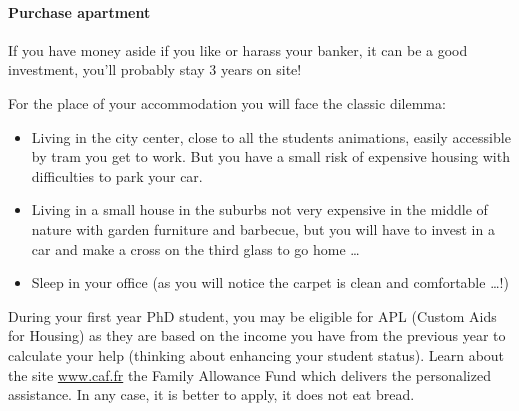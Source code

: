 \paragraph{Purchase apartment}
If you have money aside if you like or harass your banker, it can be a good investment, you'll probably stay 3 years on site!

For the place of your accommodation you will face the classic dilemma:
\begin{itemize}
  \item Living in the city center, close to all the students animations, easily accessible by tram you get to work. But you have a small risk of expensive housing with difficulties to park your car.
  \item Living in a small house in the suburbs not very expensive in the middle of nature with garden furniture and barbecue, but you will have to invest in a car and make a cross on the third glass to go home \dots
  \item Sleep in your office (as you will notice the carpet is clean and comfortable \dots!)
\end{itemize}

During your first year PhD student, you may be eligible for APL (Custom Aids for Housing) as they are based on the income you have from the previous year to calculate your help (thinking about enhancing your student status).
Learn about the site \url{www.caf.fr} the Family Allowance Fund which delivers the personalized assistance.
In any case, it is better to apply, it does not eat bread.

